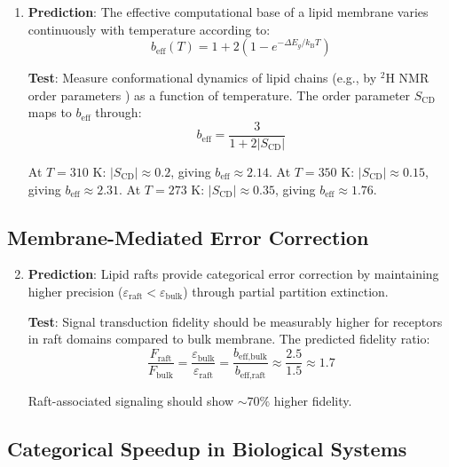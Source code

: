 \documentclass[twocolumn,10pt]{article}
\theoremstyle{remark}
\newcommand{\kB}{k_{\mathrm{B}}}
\newcommand{\eps}{\varepsilon}
\begin{document}
\begin{enumerate}
    \item \textbf{Prediction}: The effective computational base of a lipid membrane varies continuously with temperature according to:
    \begin{equation}
        b_{\text{eff}}(T) = 1 + 2(1 - e^{-\Delta E_g / \kB T})
    \end{equation}

    \textbf{Test}: Measure conformational dynamics of lipid chains (e.g., by $^2$H NMR order parameters \cite{seelig1974}) as a function of temperature. The order parameter $S_{\text{CD}}$ maps to $b_{\text{eff}}$ through:
    \begin{equation}
        b_{\text{eff}} = \frac{3}{1 + 2|S_{\text{CD}}|}
    \end{equation}

    At $T = 310$ K: $|S_{\text{CD}}| \approx 0.2$, giving $b_{\text{eff}} \approx 2.14$.
    At $T = 350$ K: $|S_{\text{CD}}| \approx 0.15$, giving $b_{\text{eff}} \approx 2.31$.
    At $T = 273$ K: $|S_{\text{CD}}| \approx 0.35$, giving $b_{\text{eff}} \approx 1.76$.
\end{enumerate}

\subsection{Membrane-Mediated Error Correction}

\begin{enumerate}
    \setcounter{enumi}{1}
    \item \textbf{Prediction}: Lipid rafts provide categorical error correction by maintaining higher precision ($\eps_{\text{raft}} < \eps_{\text{bulk}}$) through partial partition extinction.

    \textbf{Test}: Signal transduction fidelity should be measurably higher for receptors in raft domains compared to bulk membrane. The predicted fidelity ratio:
    \begin{equation}
        \frac{F_{\text{raft}}}{F_{\text{bulk}}} = \frac{\eps_{\text{bulk}}}{\eps_{\text{raft}}} = \frac{b_{\text{eff,bulk}}}{b_{\text{eff,raft}}} \approx \frac{2.5}{1.5} \approx 1.7
    \end{equation}

    Raft-associated signaling should show $\sim 70\%$ higher fidelity.
\end{enumerate}

\subsection{Categorical Speedup in Biological Systems}
\end{document}

